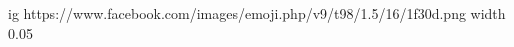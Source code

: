  
 
 
 
 

\ifcmt
  ig https://www.facebook.com/images/emoji.php/v9/t98/1.5/16/1f30d.png
  width 0.05
\fi
